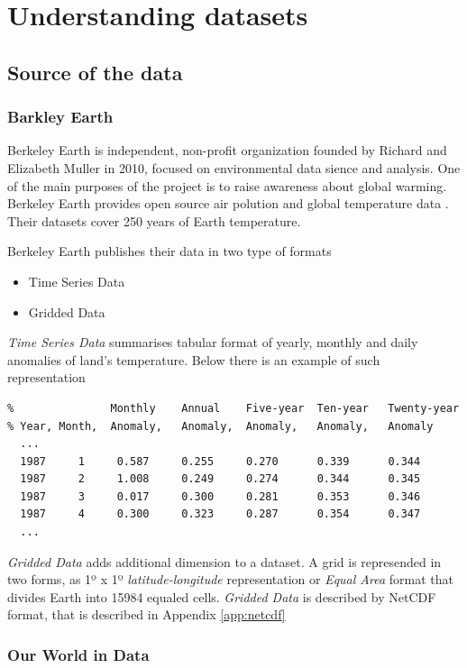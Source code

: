\chapter{Understanding datasets}

\section{Source of the data}

\subsection{Barkley Earth}

Berkeley Earth is independent, non-profit organization founded by Richard and Elizabeth Muller in 2010, focused on environmental data sience and analysis. 
One of the main purposes of the project is to raise awareness about global warming. 
Berkeley Earth provides open source air polution and global temperature data \cite{berkeleyearthdata}. 
Their datasets cover 250 years of Earth temperature.

Berkeley Earth publishes their data in two type of formats
\begin{itemize}
    \item Time Series Data
    \item Gridded Data
\end{itemize}

{\it Time Series Data} summarises tabular format of yearly, monthly and daily anomalies of land's temperature. 
Below there is an example of such representation
\begin{verbatim}
%               Monthly    Annual    Five-year  Ten-year   Twenty-year
% Year, Month,  Anomaly,   Anomaly,  Anomaly,   Anomaly,   Anomaly
  ...
  1987     1     0.587     0.255     0.270      0.339      0.344
  1987     2     1.008     0.249     0.274      0.344      0.345
  1987     3     0.017     0.300     0.281      0.353      0.346
  1987     4     0.300     0.323     0.287      0.354      0.347
  ...
\end{verbatim}

{\it Gridded Data} adds additional dimension to a dataset. A grid is represended in two forms, as 1º x 1º {\it latitude-longitude} representation or {\it Equal Area} format that divides Earth into 15984 equaled cells.
{\it Gridded Data} is described by NetCDF format, that is described in Appendix \ref{app:netcdf}

\subsection{Our World in Data}

